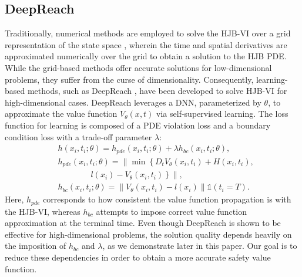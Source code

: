 \subsection{DeepReach}\label{DeepReach}
Traditionally, numerical methods are employed to solve the HJB-VI over a grid representation of the state space \cite{mitchell2004toolbox, pythonhjtoolbox}, wherein the time and spatial derivatives are approximated numerically over the grid to obtain a solution to the HJB PDE.
While the grid-based methods offer accurate solutions for low-dimensional problems, they suffer from the curse of dimensionality. Consequently, learning-based methods, such as DeepReach \cite{9561949}, have been developed to solve HJB-VI for high-dimensional cases. 
DeepReach leverages a DNN, parameterized by $\theta$, to approximate the value function $V_\theta(x,t)$ via self-supervised learning. 
The loss function for learning is composed of a PDE violation loss and a boundary condition loss with a trade-off parameter $\lambda$:
% 
% 
\begin{equation}
\label{eq: DeepReach_loss}
\begin{aligned}
& h\left(x_i, t_i ; \theta\right)=h_{pde}\left(x_i, t_i ; \theta\right)+\lambda h_{bc}\left(x_i, t_i ; \theta\right), \\
& h_{pde}\left(x_i, t_i ; \theta\right)=\| \min \left\{D_t V_\theta\left(x_i, t_i\right)+H\left(x_i, t_i\right),\right. \\
& \qquad \qquad \left.l\left(x_i\right)-V_\theta\left(x_i, t_i\right)\right\} \| ,\\
& h_{bc}\left(x_i, t_i ; \theta\right)=\left\|V_{\theta}\left(x_i, t_i \right)-l\left(x_i \right)\right\| \mathds{1}\left(t_i=T\right).
\end{aligned}
\end{equation}
% 
Here, $h_{pde}$ corresponds to how consistent the value function propagation is with the HJB-VI, whereas $h_{bc}$ attempts to impose correct value function approximation at the terminal time. 
Even though DeepReach is shown to be effective for high-dimensional problems, the solution quality depends heavily on the imposition of $h_{bc}$ and $\lambda$, as we demonstrate later in this paper. 
Our goal is to reduce these dependencies in order to obtain a more accurate safety value function.
